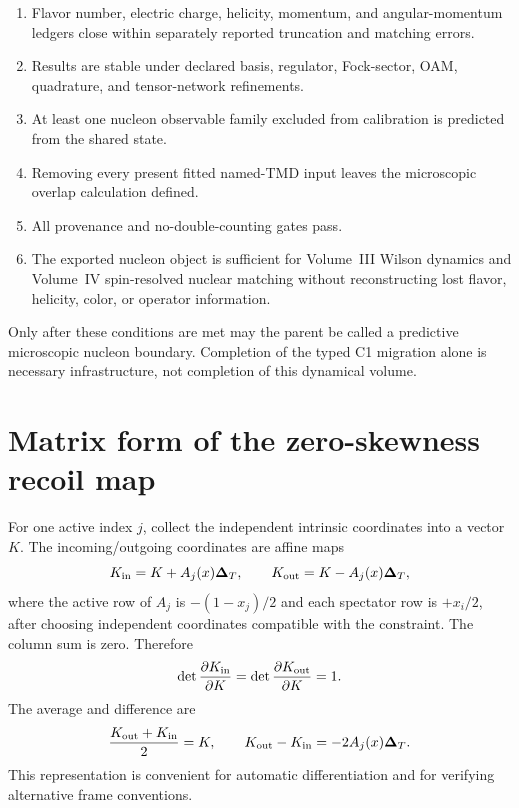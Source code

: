 \documentclass[11pt]{article}
\newcommand{\DT}{\bm{\Delta}_{T}}
\begin{document}
\begin{enumerate}
\item Flavor number, electric charge, helicity, momentum, and angular-momentum
      ledgers close within separately reported truncation and matching errors.
\item Results are stable under declared basis, regulator, Fock-sector, OAM,
      quadrature, and tensor-network refinements.
\item At least one nucleon observable family excluded from calibration is
      predicted from the shared state.
\item Removing every present fitted named-TMD input leaves the microscopic
      overlap calculation defined.
\item All provenance and no-double-counting gates pass.
\item The exported nucleon object is sufficient for Volume~III Wilson dynamics
      and Volume~IV spin-resolved nuclear matching without reconstructing lost
      flavor, helicity, color, or operator information.
\end{enumerate}

Only after these conditions are met may the parent be called a predictive
microscopic nucleon boundary.  Completion of the typed C1 migration alone is
necessary infrastructure, not completion of this dynamical volume.

\appendix

\section{Matrix form of the zero-skewness recoil map}
\label{app:recoil-matrix}

For one active index \(j\), collect the independent intrinsic coordinates
into a vector \(K\).  The incoming/outgoing coordinates are affine maps
\begin{equation}
 K_{\rm in}=K+A_j(x)\DT,
 \qquad
 K_{\rm out}=K-A_j(x)\DT,
\label{eq:recoil-affine-matrix}
\end{equation}
where the active row of \(A_j\) is \(-(1-x_j)/2\) and each spectator row is
\(+x_i/2\), after choosing independent coordinates compatible with the
constraint.  The column sum is zero.  Therefore
\begin{equation}
 \det\frac{\partial K_{\rm in}}{\partial K}
 =\det\frac{\partial K_{\rm out}}{\partial K}=1.
\label{eq:recoil-matrix-jacobian}
\end{equation}
The average and difference are
\begin{equation}
 \frac{K_{\rm out}+K_{\rm in}}2=K,
 \qquad
 K_{\rm out}-K_{\rm in}=-2A_j(x)\DT.
\label{eq:recoil-average-difference}
\end{equation}
This representation is convenient for automatic differentiation and for
verifying alternative frame conventions.
\end{document}
